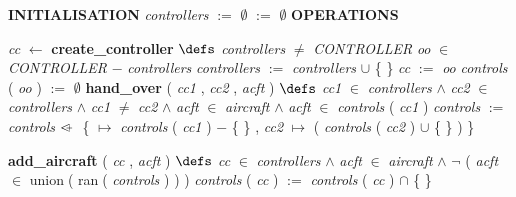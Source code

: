 \begin{tabbing}
\bSetTabs
\+\> \-
%
%
\bbnl
{\bf INITIALISATION} \+ \bbnl
{\em controllers\/} $:=$   $\emptyset$   $:=$   $\emptyset$  \-
%
%
\bnl\bnl
{\bf OPERATIONS} \+ \bbnl

%
%
{\em cc\/} $\longleftarrow$  {\bf { create\_controller}}  \bhsp $\defs$ \+ \bnl
  \+\bnl
{\em controllers\/} $\neq$ {\em CONTROLLER\/} \-\bnl
{} \+\bnl
{}  \-\bnl
{} \+\bnl
{\em oo\/} $\in$ {\em CONTROLLER\/} $-$ {\em controllers\/} \-\bnl
{} \+\bnl
{\em controllers\/} $:=$  {\em controllers\/} $\cup$  \{  \- \}  \bparallel \bnl
{\em cc\/} $:=$  {\em oo\/} \bparallel \bnl
{\em controls\/} ( {\em oo\/} )  $:=$   $\emptyset$  \-\bnl
{}  \-\bnl
{}  \- \bOperationSemiColon \bbnl
%
%
{\bf { hand\_over}} ( {\em cc1\/} , {\em cc2\/} , {\em acft\/} ) \bhsp $\defs$ \+ \bnl
  \+\bnl
{\em cc1\/} $\in$ {\em controllers\/} $\wedge$
{\em cc2\/} $\in$ {\em controllers\/} $\wedge$ \bnl
{\em cc1\/} $\neq$ {\em cc2\/} $\wedge$ \bnl
{\em acft\/} $\in$ {\em aircraft\/}\label{aircraft}  $\wedge$ \bnl
{\em acft\/} $\in$ {\em controls\/} ( {\em cc1\/} )  \-\bnl
{} \+\bnl
{\em controls\/} $:=$  {\em controls\/} $<\kern-.65em\raisebox{.275ex}{$\scriptscriptstyle +$}\;$  \{  $\mapsto$ {\em controls\/} ( {\em cc1\/} )  $-$  \{  \- \}  , \bnl
{\em cc2\/} $\mapsto$  ( {\em controls\/} ( {\em cc2\/} )  $\cup$  \{  \- \}  )  \- \}  \-\bnl
{}  \- \bOperationSemiColon 
\end{tabbing}
\bresetindent
%
%
\vspace{-4.5ex}\bsetindent
\begin{tabbing}
\bSetTabs
\+\>
%
%
{\bf { add\_aircraft}} ( {\em cc\/} , {\em acft\/} ) \bhsp $\defs$ \+ \bnl
  \+\bnl
{\em cc\/} $\in$ {\em controllers\/} $\wedge$ \bnl
{\em acft\/} $\in$ {\em aircraft\/}\label{aircraft}  $\wedge$ \bnl
$\neg$  ( {\em acft\/} $\in$  {\sf union}$\;$(  {\sf ran}$\;$( {\em controls\/} )  )  )  \-\bnl
{} \+\bnl
{\em controls\/} ( {\em cc\/} )  $:=$  {\em controls\/} ( {\em cc\/} )  $\cap$  \{  \- \}  \-\bnl
{}  \-
\end{tabbing}
